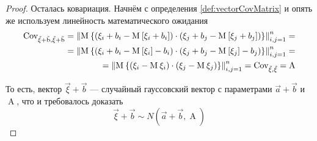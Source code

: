 \begin{proof}
    Осталась ковариация. Начнём с определения \ref{def:vectorCovMatrix} и опять же
    используем линейность математического ожидания
    \begin{align*}
        \operatorname{Cov^{}_{\vec{\xi} + \vec{b}, \vec{\xi} + \vec{b}}}
        = \left\| \operatorname{M}_{} 
            \left\{ \left( \xi_i + b_i - \operatorname{M}_{} \left[ \xi_i + b_i \right] \right)
                \cdot \left( \xi_j + b_j - \operatorname{M}_{} \left[ \xi_j + b_j \right] \right)
            \right\} \right\|_{i,j=1}^n = \\
        = \left\| \operatorname{M}_{} 
            \left\{ \left( \xi_i + b_i - \operatorname{M}_{} \left[ \xi_i \right] - b_i \right)
                \cdot \left( \xi_j + b_j - \operatorname{M}_{} \left[ \xi_j \right] - b_j \right)
            \right\} \right\|_{i,j=1}^n = \\
        = \left\| \operatorname{M}_{} 
            \left\{ \left( \xi_i - \operatorname{M}_{} \xi_i \right)
                \cdot \left( \xi_j - \operatorname{M}_{} \xi_j \right)
            \right\} \right\|_{i,j=1}^n
        = \operatorname{Cov^{}_{\vec{\xi}, \vec{\xi}}} = \operatorname{A}
    \end{align*}

    То есть, вектор $\vec{\xi} + \vec{b}$ --- случайный гауссовский вектор с
    параметрами $\vec{a} + \vec{b}$ и $\operatorname{A}$, что и требовалось доказать
    $$\vec{\xi} + \vec{b} \sim N\left( \vec{a} + \vec{b}, \operatorname{A} \right)$$
\end{proof}


